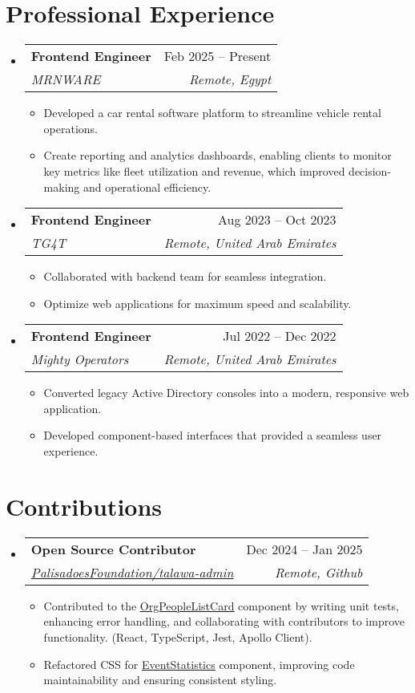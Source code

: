 \documentclass[letterpaper,11pt]{article}
\makeatletter
\newcommand{\resumeItem}[1]{
  \item\small{
    {#1 \vspace{-2pt}}
  }
}
\newcommand{\resumeSubheading}[4]{
  \vspace{-2pt}\item
    \begin{tabular*}{0.97\textwidth}[t]{l@{\extracolsep{\fill}}r}
      \textbf{#1} & #2 \\
      \textit{\small#3} & \textit{\small #4} \\
    \end{tabular*}\vspace{-7pt}
}
\newcommand{\resumeSubSubheading}[2]{
    \item
    \begin{tabular*}{0.97\textwidth}{l@{\extracolsep{\fill}}r}
      \textit{\small#1} & \textit{\small #2} \\
    \end{tabular*}\vspace{-7pt}
}
\newcommand{\resumeSubHeadingListStart}{\begin{itemize}[leftmargin=0.15in, label={}]}
\newcommand{\resumeSubHeadingListEnd}{\end{itemize}}
\newcommand{\resumeItemListStart}{\begin{itemize}}
\newcommand{\resumeItemListEnd}{\end{itemize}\vspace{-5pt}}
\makeatother
\begin{document}

\section{Professional Experience}
  \resumeSubHeadingListStart

    \resumeSubheading
      {Frontend Engineer}{Feb 2025 -- Present}
      {MRNWARE}{Remote, Egypt}
      \resumeItemListStart
        \resumeItem{Developed a car rental software platform to streamline vehicle rental operations.}
        \resumeItem{Create reporting and analytics dashboards, enabling clients to monitor key metrics like fleet 
utilization and revenue, which improved decision-making and operational efficiency. }
      \resumeItemListEnd
      

     \resumeSubheading
      {Frontend Engineer}{Aug 2023 -- Oct 2023}
      {TG4T}{Remote, United Arab Emirates}
      \resumeItemListStart
        \resumeItem{Collaborated with backend team for seamless integration.}
        \resumeItem{Optimize web applications for maximum speed and scalability.}
      \resumeItemListEnd

    \resumeSubheading
      {Frontend Engineer}{Jul 2022 -- Dec 2022}
      {Mighty Operators}{Remote, United Arab Emirates}
      \resumeItemListStart
        \resumeItem{Converted legacy Active Directory consoles into a modern, responsive web application.}
        \resumeItem{Developed component-based interfaces that provided a seamless user experience.}
      \resumeItemListEnd

  \resumeSubHeadingListEnd

\section{Contributions}
  \resumeSubHeadingListStart

    \resumeSubheading
      {Open Source Contributor}{Dec 2024 -- Jan 2025}
      {\href{https://github.com/PalisadoesFoundation/talawa-admin}{{PalisadoesFoundation/talawa-admin}}}{Remote, Github}
      \resumeItemListStart
        \resumeItem{ Contributed to the \href{https://github.com/PalisadoesFoundation/talawa-admin/pull/3112}{\underline{OrgPeopleListCard}} component by writing unit tests, enhancing error handling, 
and collaborating with contributors to improve functionality. (React, TypeScript, Jest, Apollo Client). }
        \resumeItem{Refactored CSS for \href{https://github.com/PalisadoesFoundation/talawa-admin/pull/2993} {\underline{EventStatistics}} component, improving code maintainability and ensuring 
consistent styling.}
    \resumeItemListEnd
  \resumeSubHeadingListEnd
\end{document}
